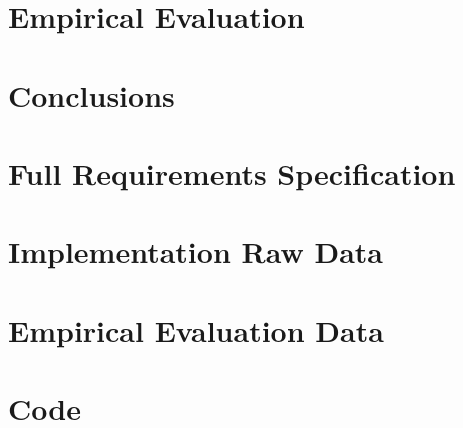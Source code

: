 \documentclass[11pt, a4paper, openright]{report}
\begin{document}
\chapter{Empirical Evaluation}
\label{c:evaluation}


\chapter{Conclusions}
\label{c:conclusions}




\begin{appendices}
\chapter{Full Requirements Specification}


\chapter{Implementation Raw Data}


\chapter{Empirical Evaluation Data}


\chapter{Code}

	
\end{appendices}
\end{document}
